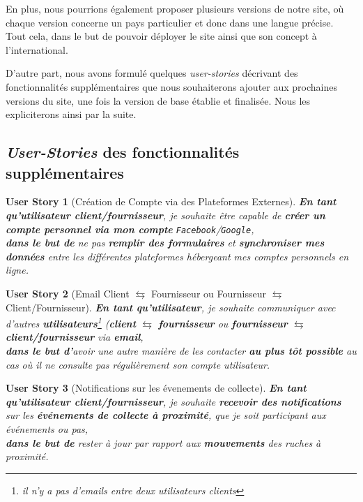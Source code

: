 \documentclass[a4paper,12pt]{book}
\theoremstyle{break}
\newtheorem*{userStory}{User Story}
\theoremstyle{break}
\theoremstyle{break}
\theoremstyle{break}
\theoremstyle{definition}
\theoremstyle{remark}
\begin{document}
En plus, nous pourrions également proposer plusieurs versions de notre site, où chaque version concerne un pays particulier et donc dans une langue précise. Tout cela, dans le but de pouvoir déployer le site ainsi que son concept à l'international.

D'autre part, nous avons formulé quelques \textit{user-stories} décrivant des fonctionnalités supplémentaires que nous souhaiterons ajouter aux prochaines versions du site, une fois la version de base établie et finalisée. Nous les expliciterons ainsi par la suite.
\subsection{\textit{User-Stories} des fonctionnalités supplémentaires}
\begin{userStory}[Création de Compte via des Plateformes Externes]
\textbf{En tant qu'utilisateur {\color{green}client}/{\color{red}fournisseur}}, je souhaite être capable de \textbf{créer un compte personnel via mon compte} \texttt{Facebook}/\texttt{Google},\\
\indent
\textbf{dans le but de} ne pas \textbf{remplir des formulaires} et \textbf{synchroniser mes données} entre les différentes plateformes hébergeant mes comptes personnels en ligne.
\end{userStory}

\begin{userStory}[Email Client $\leftrightarrows$ Fournisseur ou Fournisseur $\leftrightarrows$ Client/Fournisseur]
\textbf{En tant qu'utilisateur}, je souhaite communiquer avec d'autres \textbf{utilisateurs}\footnote{il n'y a pas d'emails entre deux utilisateurs {\color{green}clients}} (\textbf{{\color{green}client}} $\leftrightarrows$ \textbf{{\color{red}fournisseur}} ou \textbf{{\color{red}fournisseur}} $\leftrightarrows$ \textbf{{\color{green}client}/{\color{red}fournisseur}} via \textbf{email},\\
\indent
\textbf{dans le but d'}avoir une autre manière de les contacter \textbf{au plus tôt possible} au cas où il ne consulte pas régulièrement son compte utilisateur.
\end{userStory}

\begin{userStory}[Notifications sur les évenements de collecte]
\textbf{En tant qu'utilisateur {\color{green}client}/{\color{red}fournisseur}}, je souhaite \textbf{recevoir des notifications} sur les \textbf{événements de collecte à proximité}, que je soit participant aux événements ou pas,\\
\indent
\textbf{dans le but de} rester à jour par rapport aux \textbf{mouvements} des ruches à proximité.
\end{userStory}
\end{document}
